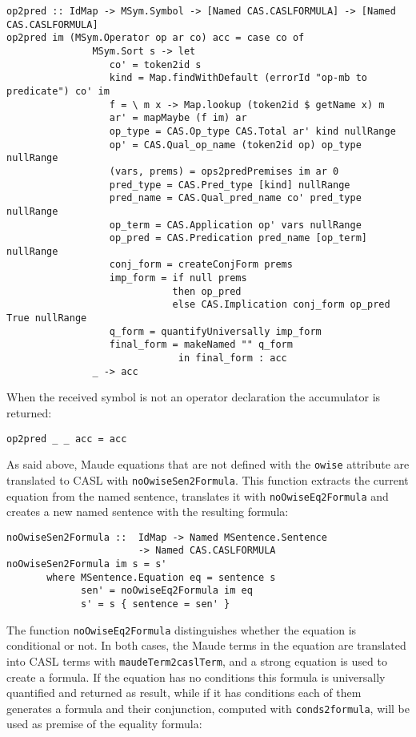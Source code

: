 {\codesize
\begin{verbatim}
op2pred :: IdMap -> MSym.Symbol -> [Named CAS.CASLFORMULA] -> [Named CAS.CASLFORMULA]
op2pred im (MSym.Operator op ar co) acc = case co of
               MSym.Sort s -> let 
                  co' = token2id s
                  kind = Map.findWithDefault (errorId "op-mb to predicate") co' im
                  f = \ m x -> Map.lookup (token2id $ getName x) m
                  ar' = mapMaybe (f im) ar
                  op_type = CAS.Op_type CAS.Total ar' kind nullRange
                  op' = CAS.Qual_op_name (token2id op) op_type nullRange
                  (vars, prems) = ops2predPremises im ar 0
                  pred_type = CAS.Pred_type [kind] nullRange
                  pred_name = CAS.Qual_pred_name co' pred_type nullRange
                  op_term = CAS.Application op' vars nullRange
                  op_pred = CAS.Predication pred_name [op_term] nullRange
                  conj_form = createConjForm prems
                  imp_form = if null prems
                             then op_pred
                             else CAS.Implication conj_form op_pred True nullRange
                  q_form = quantifyUniversally imp_form
                  final_form = makeNamed "" q_form
                              in final_form : acc
               _ -> acc
\end{verbatim}
}

When the received symbol is not an operator declaration the accumulator
is returned:

{\codesize
\begin{verbatim}
op2pred _ _ acc = acc
\end{verbatim}
}

As said above, Maude equations that are not defined with the \verb"owise"
attribute are translated to CASL with \verb"noOwiseSen2Formula". This
function extracts the current equation from the named sentence, translates
it with \verb"noOwiseEq2Formula" and creates a new named sentence
with the resulting formula:

{\codesize
\begin{verbatim}
noOwiseSen2Formula ::  IdMap -> Named MSentence.Sentence
                       -> Named CAS.CASLFORMULA
noOwiseSen2Formula im s = s'
       where MSentence.Equation eq = sentence s
             sen' = noOwiseEq2Formula im eq
             s' = s { sentence = sen' }
\end{verbatim}
}

The function \verb"noOwiseEq2Formula" distinguishes whether the equation
is conditional or not. In both cases, the Maude terms in the equation
are translated into CASL terms with \verb"maudeTerm2caslTerm", and a
strong equation is used to create a formula. If the equation has no
conditions this formula is universally quantified and returned as result,
while if it has conditions each of them generates a formula and their
conjunction, computed with \verb"conds2formula", will be used as premise
of the equality formula:

